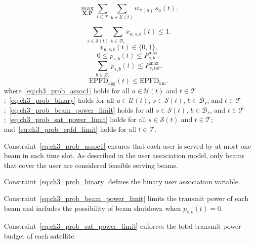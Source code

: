 \begin{equation}
\max_{\mathbf{X},\mathbf{P}}
\sum_{t\in\mathcal{T}}\sum_{u\in\mathcal{U}(t)} w_{\pi(u)}\,s_u(t).
\tag{4}\label{eq:ch3_prob_obj}
\end{equation}

\begin{equation}
\sum_{s\in\mathcal{S}(t)}\sum_{b\in\mathcal{B}_s} x_{u,s,b}(t)\le 1.
\tag{5}\label{eq:ch3_prob_assoc1}
\end{equation}
\begin{equation}
x_{u,s,b}(t)\in\{0,1\}.
\tag{6}\label{eq:ch3_prob_binary}
\end{equation}
\begin{equation}
0\le p_{s,b}(t)\le P_{s,b}^{\max}.
\tag{7}\label{eq:ch3_prob_beam_power_limit}
\end{equation}
\begin{equation}
\sum_{b\in\mathcal{B}_s} p_{s,b}(t)\le P_{s,tot}^{\max}.
\tag{8}\label{eq:ch3_prob_sat_power_limit}
\end{equation}
\begin{equation}
\mathrm{EPFD}_{\mathrm{agg}}(t)\le \mathrm{EPFD}_{\mathrm{lim}}.
\tag{9}\label{eq:ch3_prob_epfd_limit}
\end{equation}
where~\eqref{eq:ch3_prob_assoc1} holds for all $u\in\mathcal{U}(t)$ and $t\in\mathcal{T}$;~\eqref{eq:ch3_prob_binary} holds for all $u\in\mathcal{U}(t)$, $s\in\mathcal{S}(t)$, $b\in\mathcal{B}_s$, and $t\in\mathcal{T}$;~\eqref{eq:ch3_prob_beam_power_limit} holds for all $s\in\mathcal{S}(t)$, $b\in\mathcal{B}_s$, and $t\in\mathcal{T}$;~\eqref{eq:ch3_prob_sat_power_limit} holds for all $s\in\mathcal{S}(t)$ and $t\in\mathcal{T}$; and~\eqref{eq:ch3_prob_epfd_limit} holds for all $t\in\mathcal{T}$.

Constraint~\eqref{eq:ch3_prob_assoc1} ensures that each user is served by at most one beam in each time slot. As described in the user association model, only beams that cover the user are considered feasible serving beams.

Constraint~\eqref{eq:ch3_prob_binary} defines the binary user association variable.

Constraint~\eqref{eq:ch3_prob_beam_power_limit} limits the transmit power of each beam and includes the possibility of beam shutdown when $p_{s,b}(t)=0$.

Constraint~\eqref{eq:ch3_prob_sat_power_limit} enforces the total transmit power budget of each satellite.

